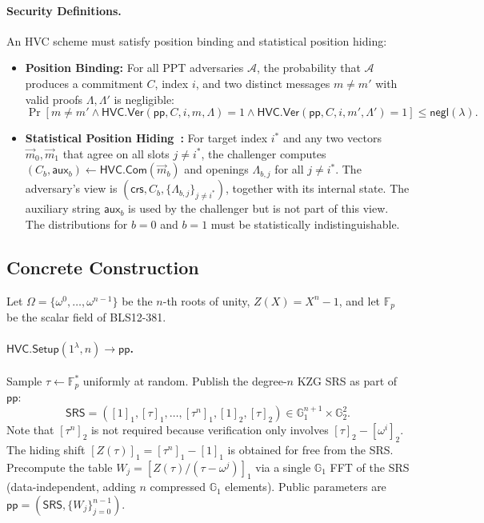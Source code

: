 \paragraph{Security Definitions.}
An HVC scheme must satisfy position binding and statistical position hiding:
\begin{itemize}
    \item \textbf{Position Binding:} For all PPT adversaries $\mathcal{A}$, the probability that $\mathcal{A}$ produces a commitment $C$, index $i$, and two distinct messages $m \neq m'$ with valid proofs $\Lambda, \Lambda'$ is negligible:
    \[
    \Pr \left[ m \neq m' \land \mathsf{HVC.Ver}(\mathsf{pp}, C, i, m, \Lambda) = 1 \land \mathsf{HVC.Ver}(\mathsf{pp}, C, i, m', \Lambda') = 1 \right] \le \mathsf{negl}(\lambda).
    \]
    \item \textbf{Statistical Position Hiding~\cite[Fig.~6, Def.~7]{CGLT23}:} For target index $i^*$ and any two vectors $\vec{m}_0, \vec{m}_1$ that agree on all slots $j \neq i^*$, the challenger computes $(C_b,\mathsf{aux}_b)\gets\mathsf{HVC.Com}(\vec m_b)$ and openings $\Lambda_{b,j}$ for all $j\ne i^*$. The adversary's view is $\left(\mathsf{crs},C_b,\{\Lambda_{b,j}\}_{j\neq i^*}\right)$, together with its internal state. The auxiliary string $\mathsf{aux}_b$ is used by the challenger but is not part of this view. The distributions for $b=0$ and $b=1$ must be statistically indistinguishable.
\end{itemize}

\subsection{Concrete Construction}

Let $\Omega = \{\omega^0, \dots, \omega^{n-1}\}$ be the $n$-th roots of unity, $Z(X) = X^n - 1$, and let $\mathbb{F}_p$ be the scalar field of BLS12-381.

\paragraph{$\mathsf{HVC.Setup}(1^\lambda, n) \to \mathsf{pp}$.}
Sample $\tau \leftarrow \mathbb{F}_p^*$ uniformly at random. Publish the degree-$n$ KZG SRS as part of $\mathsf{pp}$:
\[
\mathsf{SRS} = \left( [1]_1, [\tau]_1, \dots, [\tau^n]_1, [1]_2, [\tau]_2 \right) \in \mathbb{G}_1^{n+1} \times \mathbb{G}_2^2.
\]
Note that $[\tau^n]_2$ is not required because verification only involves $[\tau]_2 - [\omega^i]_2$. The hiding shift $[Z(\tau)]_1 = [\tau^n]_1 - [1]_1$ is obtained for free from the SRS. Precompute the table $W_j = [Z(\tau)/(\tau - \omega^j)]_1$ via a single $\mathbb{G}_1$ FFT of the SRS (data-independent, adding $n$ compressed $\mathbb{G}_1$ elements). Public parameters are $\mathsf{pp} = (\mathsf{SRS}, \{W_j\}_{j=0}^{n-1})$.

